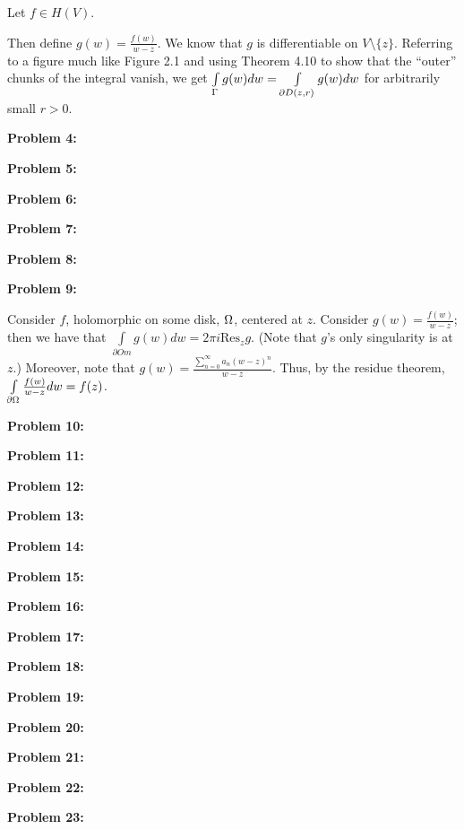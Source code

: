 \documentclass[a4paper,12pt]{article}
\begin{document}
Let $f \in H(V)$.

Then define $g(w) = \frac{f(w)}{w-z}$. We know that $g$ is differentiable on $V \setminus \{z\}$. Referring to a figure much like Figure 2.1 and using Theorem 4.10 to show that the ``outer'' chunks of the integral vanish, we get $\int\limits_{\Gamma} g(w) dw = \int\limits_{\partial D(z,r)} g(w)dw$ for arbitrarily small $r>0$.

\shunt

{\bf Problem 4:}

\shunt

{\bf Problem 5:}

\shunt

{\bf Problem 6:}

\shunt

{\bf Problem 7:}

\shunt

{\bf Problem 8:}

\shunt

{\bf Problem 9:}

Consider $f$, holomorphic on some disk, $\Omega$, centered at $z$. Consider $g(w) = \frac{f(w)}{w-z}$; then we have that $\int\limits_{\partial Om} g(w) dw= 2\pi i \text{Res}_z g$. (Note that $g$'s only singularity is at $z$.) Moreover, note that $g(w) = \frac{\sum\limits_{n=0}^\infty a_n(w-z)^n}{w-z}$. Thus, by the residue theorem, $\int\limits_{\partial \Omega} \frac{f(w)}{w-z} dw = f(z)$. 

\shunt

{\bf Problem 10:}

\shunt

{\bf Problem 11:}

\shunt

{\bf Problem 12:}

\shunt

{\bf Problem 13:}

\shunt

{\bf Problem 14:}

\shunt

{\bf Problem 15:}

\shunt

{\bf Problem 16:}

\shunt

{\bf Problem 17:}

\shunt

{\bf Problem 18:}

\shunt

{\bf Problem 19:}

\shunt

{\bf Problem 20:}

\shunt

{\bf Problem 21:}

\shunt

{\bf Problem 22:}

\shunt

{\bf Problem 23:}

\shunt
\end{document}
